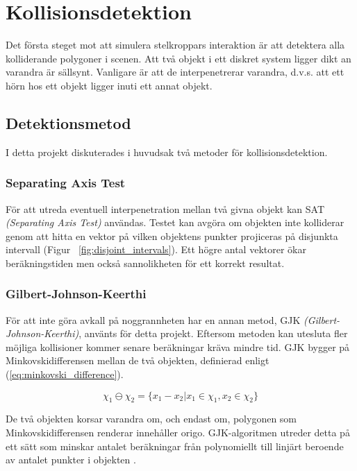 \documentclass[a4paper,12pt,twopage,swedish]{article}
\begin{document}
\section{Kollisionsdetektion}

Det första steget mot att simulera stelkroppars interaktion är att detektera alla kolliderande polygoner i scenen. Att två objekt i ett diskret system ligger dikt an varandra är sällsynt. Vanligare är att de interpenetrerar varandra, d.v.s. att ett hörn hos ett objekt ligger inuti ett annat objekt.

\subsection{Detektionsmetod}

I detta projekt diskuterades i huvudsak två metoder för kollisionsdetektion.

\subsubsection{Separating Axis Test}
För att utreda eventuell interpenetration mellan två givna objekt kan SAT \cite[s.~29]{vella08} \emph{(Separating Axis Test)} användas. Testet kan avgöra om objekten inte kolliderar genom att hitta en vektor på vilken objektens punkter projiceras på disjunkta intervall (Figur ~\ref{fig:disjoint_intervals}). Ett högre antal vektorer ökar beräkningstiden men också sannolikheten för ett korrekt resultat.

\subsubsection{Gilbert-Johnson-Keerthi}
För att inte göra avkall på noggrannheten har en annan metod, GJK \cite[s.~30]{vella08} \emph{(Gilbert-Johnson-Keerthi)}, använts för detta projekt. Eftersom metoden kan utesluta fler möjliga kollisioner kommer senare beräkningar kräva mindre tid. GJK bygger på Minkovskidifferensen mellan de två objekten, definierad enligt (\ref{eq:minkovski_difference}).

\begin{equation}\label{eq:minkovski_difference}
\chi_1 \ominus \chi_2 = \{x_1 - x_2|x_1 \in \chi_1, x_2 \in \chi_2\}
\end{equation}

De två objekten korsar varandra om, och endast om, polygonen som Minkovskidifferensen renderar innehåller origo. GJK-algoritmen utreder detta på ett sätt som minskar antalet beräkningar från polynomiellt till linjärt beroende av antalet punkter i objekten \cite{bergen99}.
\end{document}
